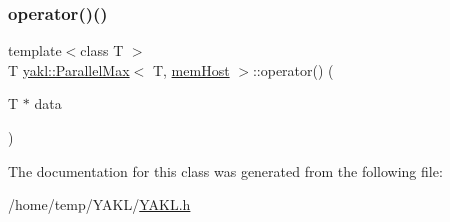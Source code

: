 \mbox{\label{classyakl_1_1ParallelMax_3_01T_00_01memHost_01_4_a1af934fd4b7c2207a3422be6c84889bb}} 
\subsubsection{\texorpdfstring{operator()()}{operator()()}}
{\footnotesize\ttfamily template$<$class T $>$ \\
T \hyperlink{classyakl_1_1ParallelMax}{yakl\+::\+Parallel\+Max}$<$ T, \hyperlink{namespaceyakl_aae8a8c910fec7cef7db68c9658c16405}{mem\+Host} $>$\+::operator() (\begin{DoxyParamCaption}\item[{T $\ast$}]{data }\end{DoxyParamCaption})\hspace{0.3cm}{\ttfamily [inline]}}



The documentation for this class was generated from the following file\+:\begin{DoxyCompactItemize}
\item 
/home/temp/\+Y\+A\+K\+L/\hyperlink{YAKL_8h}{Y\+A\+K\+L.\+h}\end{DoxyCompactItemize}
